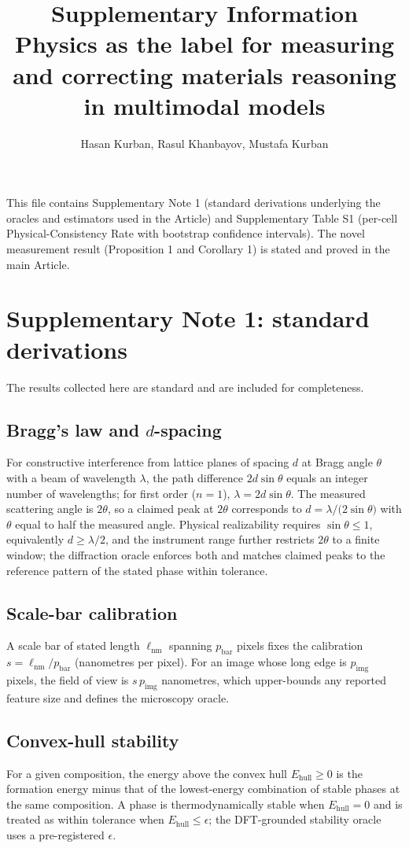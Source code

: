 \documentclass[11pt]{article}
\title{Supplementary Information\\[4pt]
\large Physics as the label for measuring and correcting materials reasoning in multimodal models}
\author{Hasan Kurban, Rasul Khanbayov, Mustafa Kurban}
\date{}
\begin{document}
\maketitle
\noindent This file contains Supplementary Note 1 (standard derivations underlying the
oracles and estimators used in the Article) and Supplementary Table S1 (per-cell
Physical-Consistency Rate with bootstrap confidence intervals). The novel measurement
result (Proposition 1 and Corollary 1) is stated and proved in the main Article.

\section*{Supplementary Note 1: standard derivations}
\noindent The results collected here are standard and are included for completeness.
\setcounter{subsection}{0}
\renewcommand{\thesubsection}{1.\arabic{subsection}}

\subsection{Bragg's law and \texorpdfstring{$d$}{d}-spacing}
For constructive interference from lattice planes of spacing $d$ at Bragg angle
$\theta$ with a beam of wavelength $\lambda$, the path difference $2d\sin\theta$ equals an
integer number of wavelengths; for first order ($n=1$), $\lambda=2d\sin\theta$. The
measured scattering angle is $2\theta$, so a claimed peak at $2\theta$ corresponds to
$d=\lambda/\!\big(2\sin\theta\big)$ with $\theta$ equal to half the measured angle.
Physical realizability requires $\sin\theta\le1$, equivalently $d\ge\lambda/2$, and the
instrument range further restricts $2\theta$ to a finite window; the diffraction oracle
enforces both and matches claimed peaks to the reference pattern of the stated phase
within tolerance.

\subsection{Scale-bar calibration}
A scale bar of stated length $\ell_{\mathrm{nm}}$ spanning $p_{\mathrm{bar}}$ pixels
fixes the calibration $s=\ell_{\mathrm{nm}}/p_{\mathrm{bar}}$ (nanometres per pixel).
For an image whose long edge is $p_{\mathrm{img}}$ pixels, the field of view is
$s\,p_{\mathrm{img}}$ nanometres, which upper-bounds any reported feature size and
defines the microscopy oracle.

\subsection{Convex-hull stability}
For a given composition, the energy above the convex hull $E_{\mathrm{hull}}\ge0$ is the
formation energy minus that of the lowest-energy combination of stable phases at the
same composition. A phase is thermodynamically stable when $E_{\mathrm{hull}}=0$ and is
treated as within tolerance when $E_{\mathrm{hull}}\le\epsilon$; the DFT-grounded
stability oracle uses a pre-registered $\epsilon$.
\end{document}
